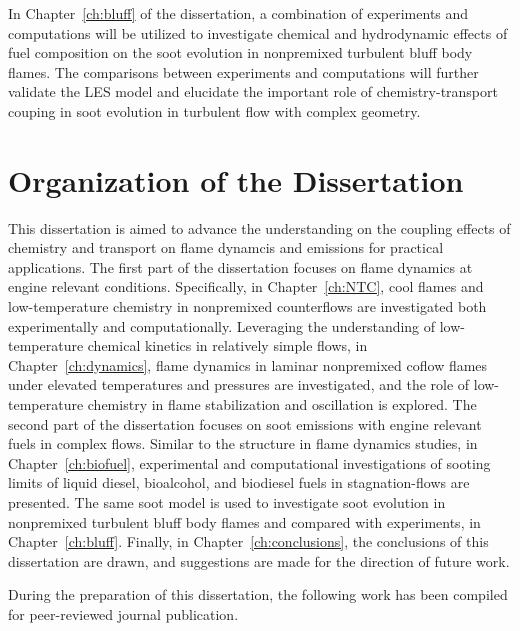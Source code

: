 In Chapter~\ref{ch:bluff} of the dissertation, a combination of experiments and computations will be utilized to investigate chemical and hydrodynamic effects of fuel composition on the soot evolution in nonpremixed turbulent bluff body flames.  The comparisons between experiments and computations will further validate the LES model and elucidate the important role of chemistry-transport couping in soot evolution in turbulent flow with complex geometry.

\section{Organization of the Dissertation}

This dissertation is aimed to advance the understanding on the coupling effects of chemistry and transport on flame dynamcis and emissions for practical applications.  The first part of the dissertation focuses on flame dynamics at engine relevant conditions.  Specifically, in Chapter~\ref{ch:NTC}, cool flames and low-temperature chemistry in nonpremixed counterflows are investigated both experimentally and computationally.  Leveraging the understanding of low-temperature chemical kinetics in relatively simple flows, in Chapter~\ref{ch:dynamics}, flame dynamics in laminar nonpremixed coflow flames under elevated temperatures and pressures are investigated, and the role of low-temperature chemistry in flame stabilization and oscillation is explored.  The second part of the dissertation focuses on soot emissions with engine relevant fuels in complex flows.  Similar to the structure in flame dynamics studies, in Chapter~\ref{ch:biofuel}, experimental and computational investigations of sooting limits of liquid diesel, bioalcohol, and biodiesel fuels in stagnation-flows are presented.  The same soot model is used to investigate soot evolution in nonpremixed turbulent bluff body flames and compared with experiments, in Chapter~\ref{ch:bluff}.  Finally, in Chapter~\ref{ch:conclusions}, the conclusions of this dissertation are drawn, and suggestions are made for the direction of future work. 

During the preparation of this dissertation, the following work has been compiled for peer-reviewed journal publication.  

